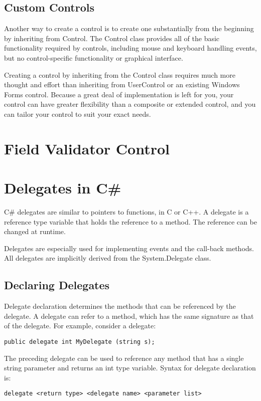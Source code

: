 \subsection*{Custom Controls}
Another way to create a control is to create one substantially from the beginning by inheriting from Control. The Control class provides all of the basic functionality required by controls, including mouse and keyboard handling events, but no control-specific functionality or graphical interface.

Creating a control by inheriting from the Control class requires much more thought and effort than inheriting from UserControl or an existing Windows Forms control. Because a great deal of implementation is left for you, your control can have greater flexibility than a composite or extended control, and you can tailor your control to suit your exact needs.
\section{Field Validator Control}


\section{Delegates in C\#}
C\# delegates are similar to pointers to functions, in C or C++. A delegate is a reference type
variable that holds the reference to a method. The reference can be changed at runtime.

Delegates are especially used for implementing events and the call-back methods. All delegates are
implicitly derived from the System.Delegate class.

\subsection*{Declaring Delegates}
Delegate declaration determines the methods that can be referenced by the delegate. A delegate can
refer to a method, which has the same signature as that of the delegate.
For example, consider a delegate:
\begin{lstlisting}
public delegate int MyDelegate (string s);
\end{lstlisting}

The preceding delegate can be used to reference any method that has a single string parameter and returns an int type variable. Syntax for delegate declaration is:

\begin{lstlisting}
delegate <return type> <delegate name> <parameter list>
\end{lstlisting}

